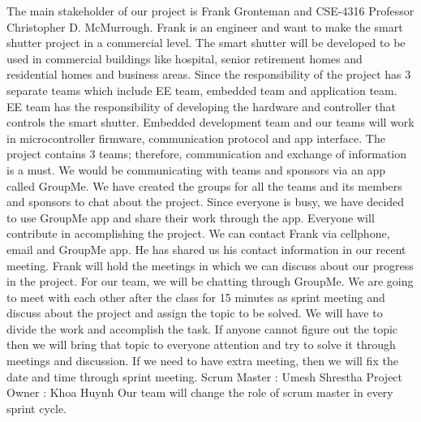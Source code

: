 The main stakeholder of our project is Frank Gronteman and CSE-4316 Professor Christopher D. McMurrough. Frank is an engineer and want to make the smart shutter project in a commercial level. The smart shutter will be developed to be used in commercial buildings like hospital, senior retirement homes and residential homes and business areas. \newline
Since the responsibility of the project has 3 separate teams which include EE team, embedded team and application team. EE team has the responsibility of developing the hardware and controller that controls the smart shutter. Embedded development team and our teams will work in microcontroller firmware, communication protocol and app interface. The project contains 3 teams; therefore, communication and exchange of information is a must. We would be communicating with teams and sponsors via an app called GroupMe. We have created the groups for all the teams and its members and sponsors to chat about the project. \newline
Since everyone is busy, we have decided to use GroupMe app and share their work through the app. Everyone will contribute in accomplishing the project. We can contact Frank via cellphone, email and GroupMe app. He has shared us his contact information in our recent meeting. Frank will hold the meetings in which we can discuss about our progress in the project. \newline
For our team, we will be chatting through GroupMe. We are going to meet with each other after the class for 15 minutes as sprint meeting and discuss about the project and assign the topic to be solved. We will have to divide the work and accomplish the task. If anyone cannot figure out the topic then we will bring that topic to everyone attention and try to solve it through meetings and discussion. If we need to have extra meeting, then we will fix the date and time through sprint meeting. \newline
Scrum Master : Umesh Shrestha 
Project Owner : Khoa Huynh
Our team will change the role of scrum master in every sprint cycle.  
